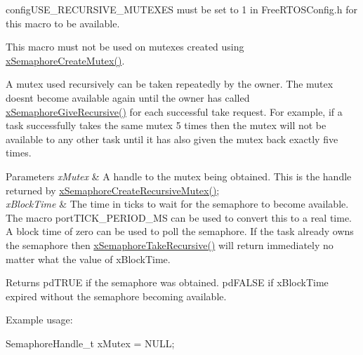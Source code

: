 config\+U\+S\+E\+\_\+\+R\+E\+C\+U\+R\+S\+I\+V\+E\+\_\+\+M\+U\+T\+E\+X\+ES must be set to 1 in Free\+R\+T\+O\+S\+Config.\+h for this macro to be available.

This macro must not be used on mutexes created using \hyperlink{vendor_2ceedling_2plugins_2freertos_2src_2freertos_2include_2semphr_8h_aa6a00aa9b91a9e5b3ebe4ae1c3f115c6}{x\+Semaphore\+Create\+Mutex()}.

A mutex used recursively can be \textquotesingle{}taken\textquotesingle{} repeatedly by the owner. The mutex doesn\textquotesingle{}t become available again until the owner has called \hyperlink{vendor_2ceedling_2plugins_2freertos_2src_2freertos_2include_2semphr_8h_a398d66b17856c22dd49d39aaac42f105}{x\+Semaphore\+Give\+Recursive()} for each successful \textquotesingle{}take\textquotesingle{} request. For example, if a task successfully \textquotesingle{}takes\textquotesingle{} the same mutex 5 times then the mutex will not be available to any other task until it has also \textquotesingle{}given\textquotesingle{} the mutex back exactly five times.


\begin{DoxyParams}{Parameters}
{\em x\+Mutex} & A handle to the mutex being obtained. This is the handle returned by \hyperlink{vendor_2ceedling_2plugins_2freertos_2src_2freertos_2include_2semphr_8h_a1bbc843be5a41ea83d2693b2189fc0f8}{x\+Semaphore\+Create\+Recursive\+Mutex()};\\
\hline
{\em x\+Block\+Time} & The time in ticks to wait for the semaphore to become available. The macro port\+T\+I\+C\+K\+\_\+\+P\+E\+R\+I\+O\+D\+\_\+\+MS can be used to convert this to a real time. A block time of zero can be used to poll the semaphore. If the task already owns the semaphore then \hyperlink{vendor_2ceedling_2plugins_2freertos_2src_2freertos_2include_2semphr_8h_ad395f4bba51eea6af3397d72bc079e4d}{x\+Semaphore\+Take\+Recursive()} will return immediately no matter what the value of x\+Block\+Time.\\
\hline
\end{DoxyParams}
\begin{DoxyReturn}{Returns}
pd\+T\+R\+UE if the semaphore was obtained. pd\+F\+A\+L\+SE if x\+Block\+Time expired without the semaphore becoming available.
\end{DoxyReturn}
Example usage\+: 
\begin{DoxyPre}
SemaphoreHandle\_t xMutex = NULL;\end{DoxyPre}



